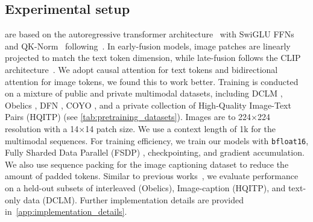 \subsection{Experimental setup}
 are based on the autoregressive transformer
architecture~\citep{vaswani2017attention} with SwiGLU
FFNs~\citep{shazeer2020glu} and QK-Norm~\citep{dehghani2023scaling}
following~\citet{li2024datacomp}. In early-fusion models, image patches are
linearly projected to match the text token dimension, while late-fusion follows
the CLIP architecture~\citep{radford2021learning}. We adopt causal attention for
text tokens and bidirectional attention for image tokens, we found this to work
better. Training is conducted on a mixture of public and private multimodal
datasets, including DCLM \citep{li2024datacomp}, Obelics
\citep{laurenccon2024obelics}, DFN \citep{fang2023data}, COYO
\citep{kakaobrain2022coyo700m}, and a private collection of High-Quality
Image-Text Pairs (HQITP) (see \cref{tab:pretraining_datasets}). Images are
 to 224×224 resolution with a 14×14 patch size. We use a context
length of 1k for the multimodal sequences. For training efficiency, we train our
models with \texttt{bfloat16},  Fully Sharded Data Parallel (FSDP)
\citep{zhao2023pytorch},  checkpointing, and gradient accumulation. We
also use sequence packing for the image captioning dataset to reduce the amount
of padded tokens. Similar to previous
works~\citep{hoffmann2022training,aghajanyan2023scalingmm,abnar2025parameters},
we evaluate performance on a held-out subsets of interleaved (Obelics),
Image-caption (HQITP), and text-only data (DCLM). Further implementation details
are provided in~\cref{app:implementation_details}.
